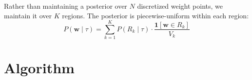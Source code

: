 \documentclass[11pt]{article}
\begin{document}
Rather than maintaining a posterior over $N$ discretized weight points, we maintain it over $K$ regions. The posterior is piecewise-uniform within each region:
\begin{equation}
    P(\mathbf{w} \mid \tau) = \sum_{k=1}^{K} P(R_k \mid \tau) \cdot \frac{\mathbf{1}[\mathbf{w} \in R_k]}{V_k}
\end{equation}

\section{Algorithm}
 
\end{document}
